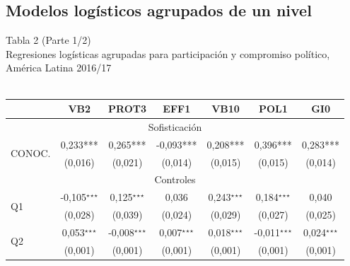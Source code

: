 \documentclass[a4paper]{tufte-handout}
\begin{document}
\subsection[Modelos logísticos agrupados de un nivel] {Modelos logísticos agrupados de un nivel}


\begin{table}[h]
  \centering
  \selectfont
   \smallskip\noindent\small Tabla 2 (Parte 1/2) \\ Regresiones logísticas agrupadas para participación y compromiso político, América Latina 2016/17  \\~\\
  \begin{tabular}{l c c c c c c}
    \toprule
     & VB2 & PROT3 & EFF1 & VB10 & POL1 & GI0 \\ \midrule
    \multicolumn{7}{c}{Sofisticación} \\ \midrule
    \multirow{2}{*}{CONOC.} & 0,233*** & 0,265*** & -0,093*** & 0,208*** & 0,396*** & 0,283*** \\
    & {\scriptsize (0,016)} & {\scriptsize (0,021)} & {\scriptsize (0,014)} & {\scriptsize (0,015)} & {\scriptsize (0,015)} & {\scriptsize (0,014)} \\ \midrule
    \multicolumn{7}{c}{Controles} \\ \midrule
    \multirow{2}{*}{Q1} & -0,105$^\star$$^\star$$^\star$ & 0,125$^\star$$^\star$$^\star$ & 0,036 & 0,243$^\star$$^\star$$^\star$ & 0,184$^\star$$^\star$$^\star$ & 0,040 \\
    & {\scriptsize (0,028)} & {\scriptsize (0,039)} & {\scriptsize (0,024)} & {\scriptsize (0,029)} & {\scriptsize (0,027)} & {\scriptsize (0,025)} \\ 
    \multirow{2}{*}{Q2} & 0,053$^\star$$^\star$$^\star$ & -0,008$^\star$$^\star$$^\star$ & 0,007$^\star$$^\star$$^\star$ & 0,018$^\star$$^\star$$^\star$ & -0,011$^\star$$^\star$$^\star$ & 0,024$^\star$$^\star$$^\star$ \\
    & {\scriptsize (0,001)} & {\scriptsize (0,001)} & {\scriptsize (0,001)} & {\scriptsize (0,001)} & {\scriptsize (0,001)} & {\scriptsize (0,001)} \\

\end{tabular}
\end{table}
\end{document}
